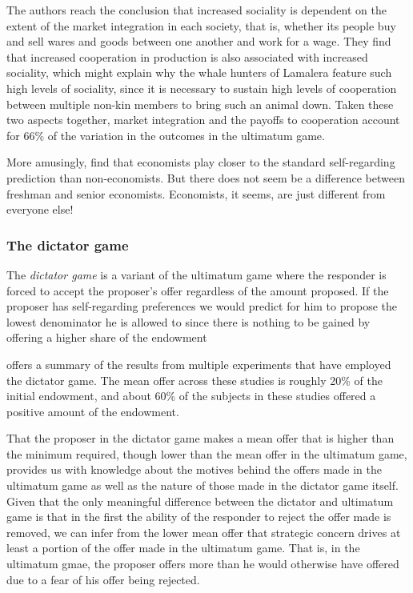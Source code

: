 \documentclass[12pt]{article}
\begin{document}
The authors reach the conclusion that increased sociality is dependent on the extent of the market integration in each society, that is, whether its people buy and sell wares and goods between one another and work for a wage. They find that increased cooperation in production is also associated with increased sociality, which might explain why the whale hunters of Lamalera feature such high levels of sociality, since it is necessary to sustain high levels of cooperation between multiple non-kin members to bring such an animal down. Taken these two aspects together, market integration and the payoffs to cooperation account for 66\% of the variation in the outcomes in the ultimatum game. 

More amusingly, \cite{Carter1991} find that economists play closer to the standard self-regarding prediction than non-economists. But there does not seem be a difference between freshman and senior economists. Economists, it seems, are just different from everyone else!



\subsubsection{The dictator game}

The \textit{dictator game} is a variant of the ultimatum game where the responder is forced to accept the proposer's offer regardless of the amount proposed. If the proposer has self-regarding preferences we would predict for him to propose the lowest denominator he is allowed to since there is nothing to be gained by offering a higher share of the endowment

\cite{camerer2011behavioral} offers a summary of the results from multiple experiments that have employed the dictator game. The mean offer across these studies is roughly 20\% of the initial endowment, and about 60\% of the subjects in these studies offered a positive amount of the endowment.

That the proposer in the dictator game makes a mean offer that is higher than the minimum required, though lower than the mean offer in the ultimatum game, provides us with knowledge about the motives behind the offers made in the ultimatum game as well as the nature of those made in the dictator game itself. Given that the only meaningful difference between the dictator and ultimatum game is that in the first the ability of the responder to reject the offer made is removed, we can infer from the lower mean offer that strategic concern drives at least a portion of the offer made in the ultimatum game. That is, in the ultimatum gmae,  	the proposer offers more than he would otherwise have offered due to a fear of his offer being rejected.
\end{document}
